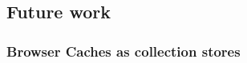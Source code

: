 \documentclass[11pt,a4paper,headsepline,twoside]{scrartcl}		%
\begin{document}









\subsection{Future work}
\label{sec:further-work}





\subsubsection{Browser Caches as collection stores}
\label{sec:browser-caches-as}
\end{document}
